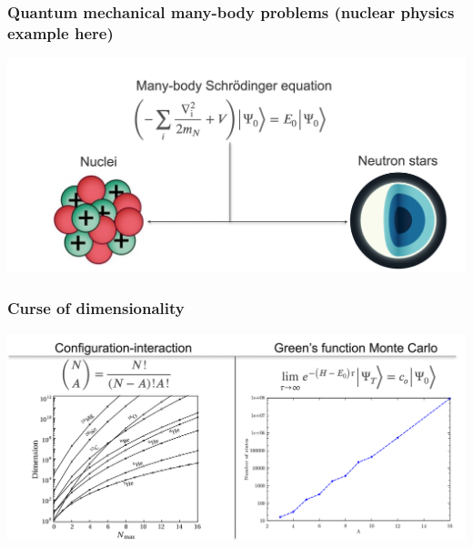 \documentclass{beamer}
\begin{document}
\begin{frame}
\frametitle{Quantum mechanical many-body problems (nuclear physics example here)}

\vspace{6mm}

\centerline{\includegraphics[width=1.1\linewidth]{qcfigures/mbpfig1.png}}

\vspace{6mm}
\end{frame}

\begin{frame}
\frametitle{Curse of dimensionality}

\vspace{6mm}

\centerline{\includegraphics[width=1.0\linewidth]{qcfigures/mbpfig2.png}}

\vspace{6mm}
\end{frame}
\end{document}
